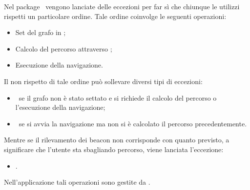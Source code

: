 \documentclass[../Funzionalita.tex]{subfiles}
\begin{document}
			Nel package \navigator\ vengono lanciate delle eccezioni per far sì che chiunque le utilizzi rispetti un particolare ordine. Tale ordine coinvolge le seguenti operazioni:
			\begin{itemize}
				\item Set del grafo in \NavigatorImp;
				\item Calcolo del percorso attraverso \NavigatorImp;
				\item Esecuzione della navigazione.
			\end{itemize}
			Il non rispetto di tale ordine può sollevare diversi tipi di eccezioni:
			\begin{itemize}
				\item \NoGraphSetException\ se il grafo non è stato settato e si richiede il calcolo del percorso o l'esecuzione della navigazione;
				\item \NoNavigationInformationException\ se si avvia la navigazione ma non si è calcolato il percorso precedentemente.
			\end{itemize}
			Mentre se il rilevamento dei \gls{beacon} non corrisponde con quanto previsto, a significare che l'utente sta sbagliando percorso, viene lanciata l'eccezione:
			\begin{itemize}
				\item \PathException.
			\end{itemize}
			Nell'applicazione tali operazioni sono gestite da \NavigationManagerImp.
\end{document}
